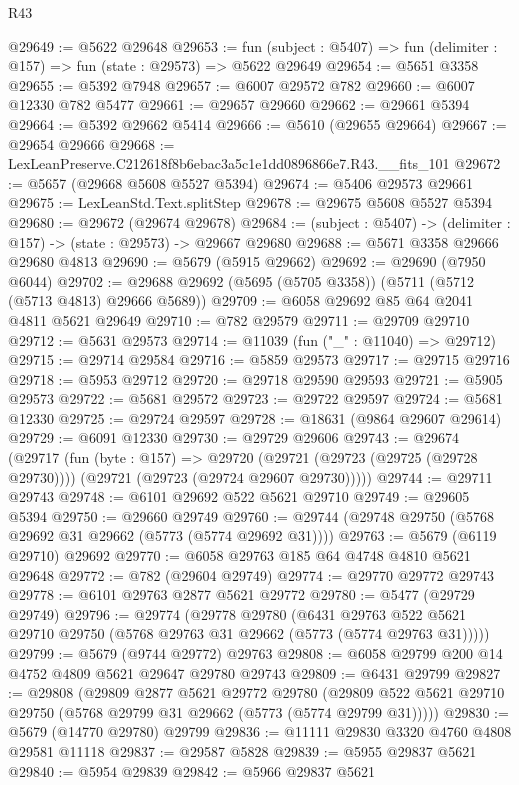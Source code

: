 \begin{lexlean}{R43}
\begin{coremodule}
@29649 := @5622 @29648
@29653 := fun (subject : @5407) => fun (delimiter : @157) => fun (state : @29573) => @5622 @29649
@29654 := @5651 @3358
@29655 := @5392 @7948
@29657 := @6007 @29572 @782
@29660 := @6007 @12330 @782 @5477
@29661 := @29657 @29660
@29662 := @29661 @5394
@29664 := @5392 @29662 @5414
@29666 := @5610 (@29655 @29664)
@29667 := @29654 @29666
@29668 := LexLeanPreserve.C212618f8b6ebac3a5c1e1dd0896866e7.R43.__fits_101
@29672 := @5657 (@29668 @5608 @5527 @5394)
@29674 := @5406 @29573 @29661
@29675 := LexLeanStd.Text.splitStep
@29678 := @29675 @5608 @5527 @5394
@29680 := @29672 (@29674 @29678)
@29684 := (subject : @5407) -> (delimiter : @157) -> (state : @29573) -> @29667 @29680
@29688 := @5671 @3358 @29666 @29680 @4813
@29690 := @5679 (@5915 @29662)
@29692 := @29690 (@7950 @6044)
@29702 := @29688 @29692 (@5695 (@5705 @3358)) (@5711 (@5712 (@5713 @4813) @29666 @5689))
@29709 := @6058 @29692 @85 @64 @2041 @4811 @5621 @29649
@29710 := @782 @29579
@29711 := @29709 @29710
@29712 := @5631 @29573
@29714 := @11039 (fun ("_" : @11040) => @29712)
@29715 := @29714 @29584
@29716 := @5859 @29573
@29717 := @29715 @29716
@29718 := @5953 @29712
@29720 := @29718 @29590 @29593
@29721 := @5905 @29573
@29722 := @5681 @29572
@29723 := @29722 @29597
@29724 := @5681 @12330
@29725 := @29724 @29597
@29728 := @18631 (@9864 @29607 @29614)
@29729 := @6091 @12330
@29730 := @29729 @29606
@29743 := @29674
    (@29717
      (fun (byte : @157) =>
      @29720 (@29721 (@29723 (@29725 (@29728 @29730)))) (@29721 (@29723 (@29724 @29607 @29730)))))
@29744 := @29711 @29743
@29748 := @6101 @29692 @522 @5621 @29710
@29749 := @29605 @5394
@29750 := @29660 @29749
@29760 := @29744 (@29748 @29750 (@5768 @29692 @31 @29662 (@5773 (@5774 @29692 @31))))
@29763 := @5679 (@6119 @29710) @29692
@29770 := @6058 @29763 @185 @64 @4748 @4810 @5621 @29648
@29772 := @782 (@29604 @29749)
@29774 := @29770 @29772 @29743
@29778 := @6101 @29763 @2877 @5621 @29772
@29780 := @5477 (@29729 @29749)
@29796 := @29774
    (@29778
      @29780
      (@6431 @29763 @522 @5621 @29710 @29750 (@5768 @29763 @31 @29662 (@5773 (@5774 @29763 @31)))))
@29799 := @5679 (@9744 @29772) @29763
@29808 := @6058 @29799 @200 @14 @4752 @4809 @5621 @29647 @29780 @29743
@29809 := @6431 @29799
@29827 := @29808
    (@29809
      @2877
      @5621
      @29772
      @29780
      (@29809 @522 @5621 @29710 @29750 (@5768 @29799 @31 @29662 (@5773 (@5774 @29799 @31)))))
@29830 := @5679 (@14770 @29780) @29799
@29836 := @11111 @29830 @3320 @4760 @4808 @29581 @11118
@29837 := @29587 @5828
@29839 := @5955 @29837 @5621
@29840 := @5954 @29839
@29842 := @5966 @29837 @5621

\end{coremodule}
\end{lexlean}
